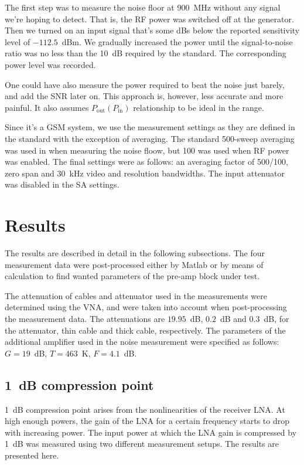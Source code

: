 \documentclass[a4paper, 12pt]{article}
\begin{document}
The first step was to measure the noise floor at 900~MHz without any signal 
we're hoping to detect. That is, the RF power was switched off at the generator. 
Then we turned on an input signal that's some dBs below the reported sensitivity 
level of $-112.5$~dBm. We gradually increased the power until the signal-to-noise 
ratio was no less than the 10~dB required by the standard. The corresponding power 
level was recorded.

One could have also measure the power required to beat the noise just barely, and 
add the SNR later on. This approach is, however, less accurate and more painful. It 
also assumes $P_\mathrm{out}(P_\mathrm{in})$ relationship to be ideal in the range.

Since it's a GSM system, we use the measurement settings as they are defined in 
the standard with the exception of averaging. The standard 500-sweep averaging was 
used in when measuring the noise floow, but 100 was used when RF power was enabled. 
The final settings were as follows: an averaging factor of 500/100, zero span and 
30~kHz video and resolution bandwidths. The input attenuator was disabled in the 
SA settings.


\newpage
\section{Results}

The results are described in detail in the following subsections. The four measurement 
data were post-processed either by Matlab or by means of calculation to find wanted 
parameters of the pre-amp block under test.

The attenuation of cables and attenuator used in the measurements were determined using 
the VNA, and were taken into account when post-processing the measurement data. The 
attenuations are $19.95$~dB, $0.2$~dB and $0.3$~dB, for the attenuator, thin cable and 
thick cable, respectively. The parameters of the additional amplifier used in the noise 
measurement were specified as follows: $G = 19$~dB, $T = 463$~K, $F = 4.1$~dB.


\subsection{1~dB compression point}

1~dB compression point arises from the nonlinearities of the receiver LNA. At high enough 
powers, the gain of the LNA for a certain frequency starts to drop with increasing power. 
The input power at which the LNA gain is compressed by 1~dB was measured using two different 
measurement setups. The results are presented here.
\end{document}
